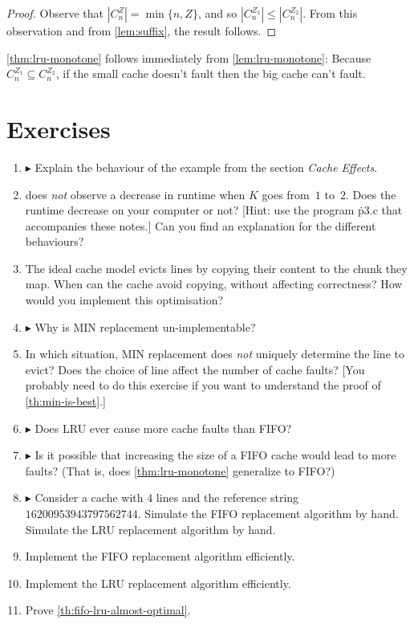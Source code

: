 \begin{proof}
Observe that $|C^Z_n|=\min\{n, Z\}$, and so $|C^{Z_1}_n|\le|C^{Z_2}_n|$.
From this observation and from \autoref{lem:suffix},
  the result follows.
\end{proof}

\autoref{thm:lru-monotone} follows immediately from \autoref{lem:lru-monotone}:
Because $C^{Z_1}_n \subseteq C^{Z_2}_n$,
  if the small cache doesn't fault then the big cache can't fault.

\section{Exercises}

\begin{enumerate}
\item
  $\blacktriangleright$
  Explain the behaviour of the example from the section \emph{Cache Effects}.
\item
  \citet{blog-cache-effects} does \emph{not} observe a decrease in runtime
    when $K$ goes from~$1$ to~$2$.
  Does the runtime decrease on your computer or not?
  [Hint: use the program \.{p3.c} that accompanies these notes.]
  Can you find an explanation for the different behaviours?
\item
  The ideal cache model evicts lines by copying their content to the chunk they map.
  When can the cache avoid copying, without affecting correctness?
  How would you implement this optimisation?
\item
  $\blacktriangleright$
  Why is MIN replacement un-implementable?
\item
  In which situation,
  MIN replacement does \emph{not} uniquely determine the line to evict?
  Does the choice of line affect the number of cache faults?
  [You probably need to do this exercise if you want to understand
    the proof of \autoref{th:min-is-best}.]
\item
  $\blacktriangleright$
  Does LRU ever cause more cache faults than FIFO?
\item
  $\blacktriangleright$
  Is it possible that increasing the size of a FIFO cache would lead to more faults?
  (That is, does \autoref{thm:lru-monotone} generalize to FIFO?)
\item
  $\blacktriangleright$
  Consider a cache with $4$ lines and the reference string $16200953943797562744$.
  Simulate the FIFO replacement algorithm by hand.
  Simulate the LRU replacement algorithm by hand.
\item
  Implement the FIFO replacement algorithm efficiently.
\item
  Implement the LRU replacement algorithm efficiently.
\item
  Prove \autoref{th:fifo-lru-almost-optimal}.
\end{enumerate}


